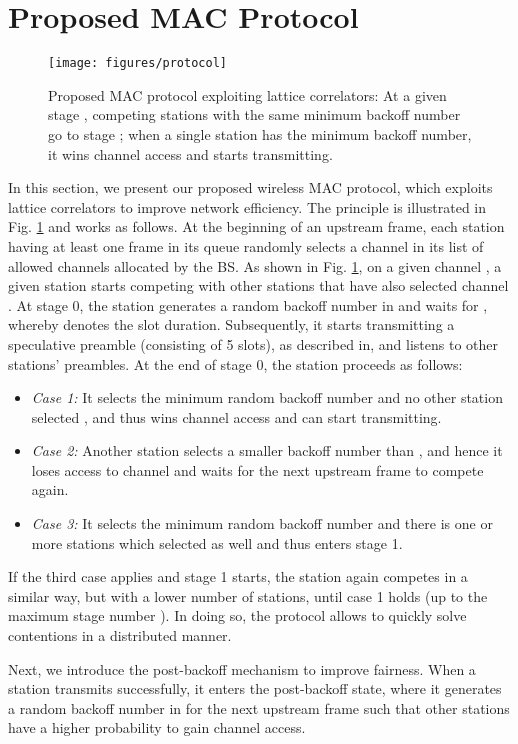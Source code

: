 \documentclass[journal,10pt,draftclsnofoot,onecolumn]{IEEEtran}
\begin{document}
\section{Proposed MAC Protocol}
\label{sec:proposedProtocol}
\begin{figure}
\centering
\texttt{[image: figures/protocol]}
\caption{Proposed MAC protocol exploiting lattice correlators: At a given stage , competing stations with the same minimum backoff number go to stage ; when a single station has the minimum backoff number, it wins channel access and starts transmitting.}
\label{fig:proposedMAC}
\end{figure}
In this section, we present our proposed wireless MAC protocol, which exploits lattice correlators to improve network efficiency. The principle is illustrated in Fig. \ref{fig:proposedMAC} and works as follows. At the beginning of an upstream frame, each station having at least one frame in its queue randomly selects a channel in its list of allowed channels allocated by the BS. As shown in Fig. \ref{fig:proposedMAC}, on a given channel , a given station starts competing with other stations that have also selected channel . At stage 0, the station generates a random backoff number  in  and waits for , whereby  denotes the slot duration. Subsequently, it starts transmitting a speculative preamble (consisting of 5 slots), as described in\cite{wifiNano}, and listens to other stations' preambles. At the end of stage 0, the station proceeds as follows:
\begin{itemize}
\item \textit{Case 1:} It selects the minimum random backoff number  and no other station selected , and thus wins channel access and can start transmitting.
\item \textit{Case 2:} Another station selects a smaller backoff number than , and hence it loses access to channel  and waits for the next upstream frame to compete again.
\item \textit{Case 3:} It selects the minimum random backoff number  and there is one or more stations which selected  as well and thus enters stage 1.
\end{itemize}  
If the third case applies and stage 1 starts, the station again competes in a similar way, but with a lower number of stations, until case 1 holds (up to the maximum stage number ). In doing so, the protocol allows to quickly solve contentions in a distributed manner. 
	
Next, we introduce the post-backoff mechanism to improve fairness. When a station transmits successfully, it enters the post-backoff state, where it generates a random backoff number in  for the next upstream frame such that other stations have a higher probability to gain channel access. 
	
\end{document}
